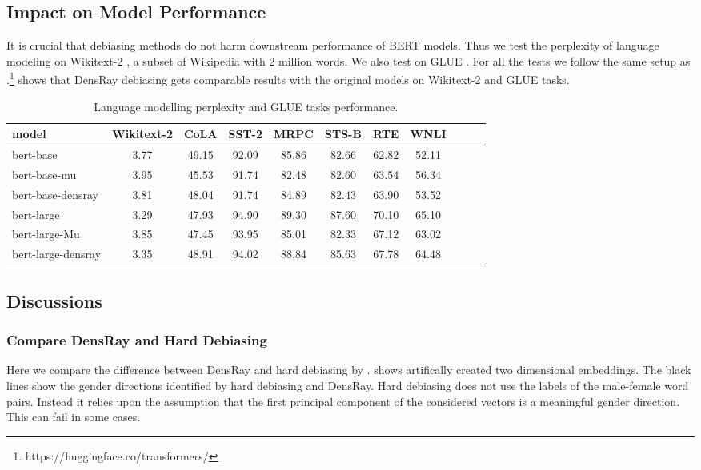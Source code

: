 
\subsection{Impact on Model Performance}
It is crucial that debiasing methods do not harm downstream
performance of BERT models. Thus we test the perplexity of
language modeling on Wikitext-2
\citep{merity2016pointer}, a subset of Wikipedia with 2
million words. We also test on GLUE
\citep{wang2018glue}. For all the tests we follow the same
setup as
\citet{wolf2019huggingfaces}.\footnote{https://huggingface.co/transformers/} 
shows that DensRay debiasing gets comparable results with
the original models on Wikitext-2 and GLUE tasks.
\begin{table}[ht]
\centering
\footnotesize
\begin{tabular}{lcccccccccc}
\hline
model & Wikitext-2&CoLA &SST-2&MRPC&STS-B&RTE&WNLI\\
\hline
bert-base &3.77&49.15&92.09&85.86&82.66&62.82&52.11\\
bert-base-mu &3.95&45.53&91.74&82.48&82.60&63.54&56.34\\
bert-base-densray &3.81&48.04&91.74&84.89&82.43&63.90&53.52\\
\hline
bert-large &3.29& 47.93&94.90&89.30&87.60&70.10&65.10\\
bert-large-Mu &3.85& 47.45&93.95&85.01&82.33&67.12&63.02\\
bert-large-densray &3.35& 48.91&94.02&88.84&85.63&67.78&64.48\\
\hline
\end{tabular}
\caption{
Language modelling perplexity and GLUE tasks
performance. }
\end{table}

\subsection{Discussions}
\subsubsection{Compare DensRay and Hard Debiasing}
Here we compare the difference between DensRay and hard debiasing by \citep{mu2018all}.  shows artifically created two dimensional embeddings. The black lines show the gender directions identified by hard debiasing and DensRay. Hard debiasing does not use the labels of the male-female word pairs. Instead it relies upon the assumption that the first principal component of the considered vectors is a meaningful gender direction. This can fail in some cases. 

